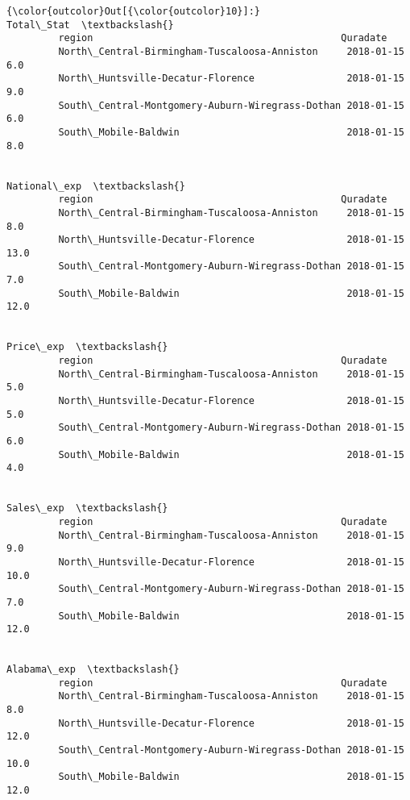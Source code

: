 \documentclass[11pt]{article}
\begin{document}
\begin{Verbatim}[commandchars=\\\{\}]
{\color{outcolor}Out[{\color{outcolor}10}]:}                                                              Total\_Stat  \textbackslash{}
         region                                           Quradate                 
         North\_Central-Birmingham-Tuscaloosa-Anniston     2018-01-15         6.0   
         North\_Huntsville-Decatur-Florence                2018-01-15         9.0   
         South\_Central-Montgomery-Auburn-Wiregrass-Dothan 2018-01-15         6.0   
         South\_Mobile-Baldwin                             2018-01-15         8.0   
         
                                                                      National\_exp  \textbackslash{}
         region                                           Quradate                   
         North\_Central-Birmingham-Tuscaloosa-Anniston     2018-01-15           8.0   
         North\_Huntsville-Decatur-Florence                2018-01-15          13.0   
         South\_Central-Montgomery-Auburn-Wiregrass-Dothan 2018-01-15           7.0   
         South\_Mobile-Baldwin                             2018-01-15          12.0   
         
                                                                      Price\_exp  \textbackslash{}
         region                                           Quradate                
         North\_Central-Birmingham-Tuscaloosa-Anniston     2018-01-15        5.0   
         North\_Huntsville-Decatur-Florence                2018-01-15        5.0   
         South\_Central-Montgomery-Auburn-Wiregrass-Dothan 2018-01-15        6.0   
         South\_Mobile-Baldwin                             2018-01-15        4.0   
         
                                                                      Sales\_exp  \textbackslash{}
         region                                           Quradate                
         North\_Central-Birmingham-Tuscaloosa-Anniston     2018-01-15        9.0   
         North\_Huntsville-Decatur-Florence                2018-01-15       10.0   
         South\_Central-Montgomery-Auburn-Wiregrass-Dothan 2018-01-15        7.0   
         South\_Mobile-Baldwin                             2018-01-15       12.0   
         
                                                                      Alabama\_exp  \textbackslash{}
         region                                           Quradate                  
         North\_Central-Birmingham-Tuscaloosa-Anniston     2018-01-15          8.0   
         North\_Huntsville-Decatur-Florence                2018-01-15         12.0   
         South\_Central-Montgomery-Auburn-Wiregrass-Dothan 2018-01-15         10.0   
         South\_Mobile-Baldwin                             2018-01-15         12.0   
         

\end{Verbatim}
\end{document}
